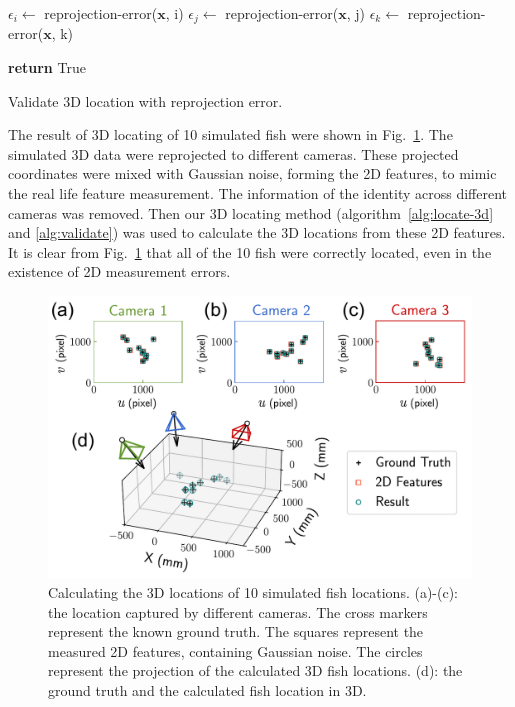 \documentclass[11pt,twoside]{report}
\begin{document}
\begin{algorithm}

$\epsilon_i \gets$ reprojection-error($\mathbf{x}$, i)\;
$\epsilon_j \gets$ reprojection-error($\mathbf{x}$, j)\;
$\epsilon_k \gets$ reprojection-error($\mathbf{x}$, k)\;

	{\textbf{return} True}

\caption{Validate 3D location with reprojection error.}
\label{alg:validate}
\end{algorithm}



The result of 3D locating of 10 simulated fish were shown in Fig.~\ref{fig:locate-many-valid}. The simulated 3D data were reprojected to different cameras. These projected coordinates were mixed with Gaussian noise, forming the 2D features, to mimic the real life feature measurement. The information of the identity across different cameras was removed. Then our 3D locating method (algorithm~\ref{alg:locate-3d} and \ref{alg:validate}) was used to calculate the 3D locations from these 2D features. It is clear from Fig.~\ref{fig:locate-many-valid} that all of the 10 fish were correctly located, even in the existence of 2D measurement errors.


\begin{figure}
  \includegraphics[width=\linewidth]{locate-many-valid}
  \caption[Three dimensional tracking result of simulated data]{
    Calculating the 3D locations of 10 simulated fish locations.
  	(a)-(c): the location captured by different cameras. The cross markers represent the known ground truth. The squares represent the measured 2D features, containing Gaussian noise. The circles represent the projection of the calculated 3D fish locations.
  	(d): the ground truth and the calculated fish location in 3D.
  }
  \label{fig:locate-many-valid}
\end{figure}
\end{document}
